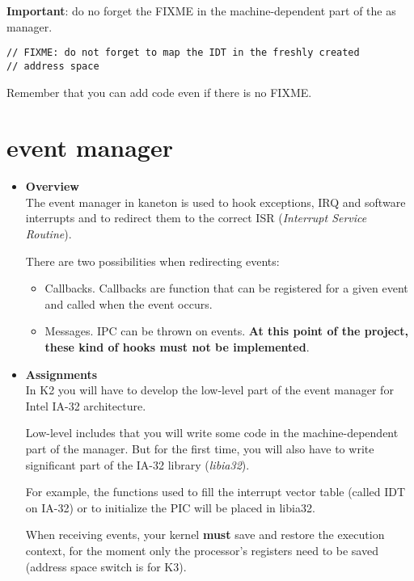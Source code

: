 \textbf{Important}: do no forget the FIXME in the machine-dependent
part of the as manager.

\begin{verbatim}
// FIXME: do not forget to map the IDT in the freshly created
// address space
\end{verbatim}

Remember that you can add code even if there is no FIXME.

%
%

\newpage

\section{\textbf{event} manager}

\begin{itemize}
  \item {\bf Overview}\\

    The event manager in kaneton is used to hook exceptions, IRQ and
    software interrupts and to redirect them to the correct ISR
    (\emph{Interrupt Service Routine}).

    There are two possibilities when redirecting events:
    \begin{itemize}
      \item
	Callbacks. Callbacks are function that can be registered for a
	given event and called when the event occurs.
      \item
	Messages. IPC can be thrown on events. \textbf{At this point
	of the project, these kind of hooks must not be implemented}.
    \end{itemize}

  \item {\bf Assignments}\\

    In K2 you will have to develop the low-level part of the event
    manager for Intel IA-32 architecture.

    Low-level includes that you will write some code in the
    machine-dependent part of the manager. But for the first time, you
    will also have to write significant part of the IA-32 library
    (\emph{libia32}).

    For example, the functions used to fill the interrupt vector table
    (called IDT on IA-32) or to initialize the PIC will be placed in
    libia32.

    When receiving events, your kernel \textbf{must} save and restore
    the execution context, for the moment only the processor's
    registers need to be saved (address space switch is for K3).


\end{itemize}
